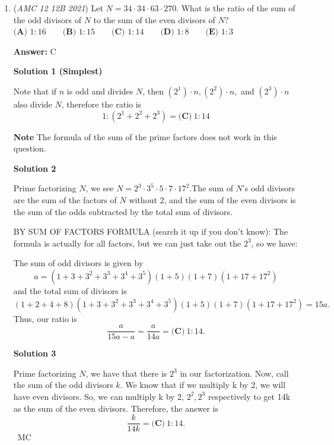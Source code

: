 \begin{enumerate}
 Therefore, the height is divided by $3$ and divided by $4$, which is $18 \div 3 \div 4 = \boxed{\textbf{(A)} ~1.5}.$



	\item (\textit{AMC 12 12B 2021}) Let $N=34\cdot34\cdot63\cdot270.$ What is the ratio of the sum of the odd divisors of $N$ to the sum of the even divisors of $N?$
$\textbf{(A) }1:16 \qquad \textbf{(B) }1:15 \qquad \textbf{(C) }1:14 \qquad \textbf{(D) }1:8 \qquad \textbf{(E) }1:3$

 \textbf{Answer: }C



\textbf{Solution 1 (Simplest)}

Note that if $n$ is odd and divides $N$, then $(2^1)\cdot n, (2^2)\cdot n,$ and $(2^3)\cdot n$ also divide $N$, therefore the ratio is 
 \[1:(2^1+2^2+2^3)=\boxed{\textbf{(C)} ~1 : 14}\]

 \textbf{Note} The formula of the sum of the prime factors does not work in this question.

 



\textbf{Solution 2}

Prime factorizing $N$, we see $N=2^{3} \cdot 3^{5} \cdot 5\cdot 7\cdot 17^{2}$.The sum of $N$'s odd divisors are the sum of the factors of $N$ without $2$, and the sum of the even divisors is the sum of the odds subtracted by the total sum of divisors. 

 BY SUM OF FACTORS FORMULA (search it up if you don't know): The formula is actually for all factors, but we can just take out the $2^3$, so we have:

 The sum of odd divisors is given by 
 \[a = (1+3+3^2 + 3^3 + 3^4 + 3^5)(1 + 5)(1+7)(1+17+17^2)\] and the total sum of divisors is 
 \[(1+2+4+8)(1+3+3^2 + 3^3 + 3^4 + 3^5)(1 + 5)(1+7)(1+17+17^2) = 15a.\] Thus, our ratio is 
 \[\frac{a}{15a-a} = \frac{a}{14a} = \boxed{\textbf{(C)} ~1 : 14}.\]




\textbf{Solution 3}

Prime factorizing $N$, we have that there is $2^3$ in our factorization. Now, call the sum of the odd divisors $k$. We know that if we multiply k by 2, we will have even divisors. So, we can multiply k by 2, $2^2, 2^3$ respectively to get 14k as the sum of the even divisors. Therefore, the answer is 
 \[\frac{k}{14k} = \boxed{\textbf{(C)} ~1:14}.\]~MC

 



\end{enumerate}
